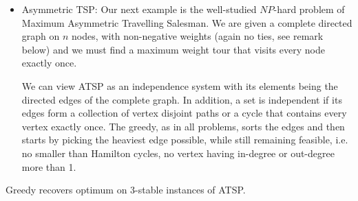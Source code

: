 \begin{itemize}
\item Asymmetric TSP: Our next example is the well-studied $NP$-hard problem of Maximum Asymmetric Travelling Salesman. We are given a complete directed
graph on $n$ nodes, with non-negative weights (again no ties, see remark  below) and we must find a maximum weight tour that visits every node exactly once. 

We can view ATSP as an independence system with its elements being the directed edges of the complete graph. In addition, a set is independent if its edges form a collection of vertex disjoint paths or a cycle that contains every vertex exactly once. The greedy, as in all problems, sorts the edges and then starts by picking the heaviest edge possible, while still remaining feasible, i.e. no smaller than Hamilton cycles, no vertex having in-degree or out-degree more than 1.
\end{itemize}
\begin{proposition}
Greedy recovers optimum on 3-stable instances of ATSP.
\end{proposition}
